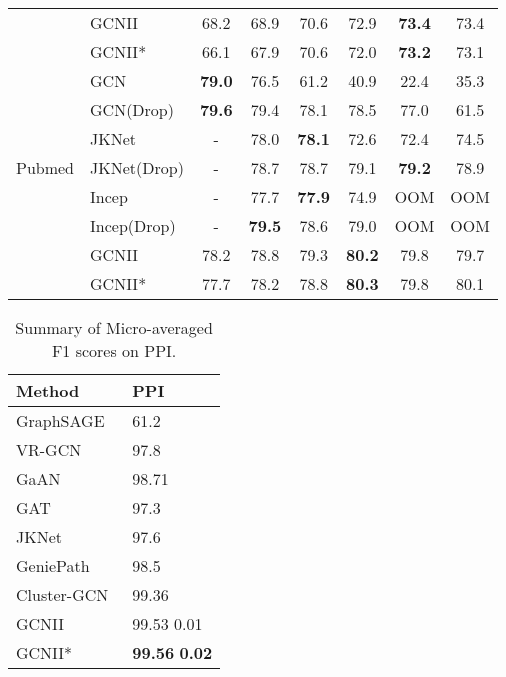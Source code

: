 \documentclass{article}
\begin{document}
\begin{table}[t]
\begin{small}
{\begin{tabular}{ll|cccccc}
                                        & GCNII & 68.2  & 68.9  & 70.6  & 72.9  & \textbf{73.4}  & 73.4  \\
                                        & GCNII* & 66.1  & 67.9  & 70.6  & 72.0  & \textbf{73.2}  & 73.1  \\
            \midrule
            \multirow{7}{*}{Pubmed}     & GCN & \textbf{79.0}  & 76.5  & 61.2  & 40.9  & 22.4  & 35.3  \\
                                        & GCN(Drop) & \textbf{79.6}  & 79.4  & 78.1  & 78.5  & 77.0  & 61.5  \\
                                        & JKNet & - & 78.0  & \textbf{78.1}  & 72.6  & 72.4 & 74.5  \\
                                        & JKNet(Drop) & - & 78.7  & 78.7  & 79.1  & \textbf{79.2} & 78.9 \\
                                        & Incep & - & 77.7  & \textbf{77.9}  & 74.9  & OOM & OOM  \\
                                        & Incep(Drop) & - & \textbf{79.5}  & 78.6  & 79.0  & OOM & OOM  \\
                                        & GCNII & 78.2  & 78.8  & 79.3  & \textbf{80.2}  & 79.8  & 79.7  \\
                                        & GCNII* & 77.7  & 78.2  & 78.8  & \textbf{80.3}  & 79.8  & 80.1  \\
        \bottomrule
    \end{tabular}}
    \end{small}
\vskip -0.1in
\end{table}

\begin{table}[t]
\caption{Summary of Micro-averaged F1 scores on PPI.}
    \label{ppi-table}
    \vskip 0.15in
    \begin{center}
\begin{tabular}{ll}
    \toprule
    Method & PPI\\
    \midrule
    GraphSAGE~\cite{hamilton2017inductive} & 61.2 \\
    VR-GCN~\cite{DBLP:conf/icml/ChenZS18} & 97.8 \\
    GaAN~\cite{DBLP:conf/uai/ZhangSXMKY18} & 98.71 \\
    GAT~\cite{velickovic2018graph} & 97.3 \\
    JKNet~\cite{DBLP:conf/icml/XuLTSKJ18} & 97.6 \\
    GeniePath~\cite{DBLP:conf/aaai/LiuCLZLSQ19} & 98.5 \\
    Cluster-GCN~\cite{DBLP:conf/kdd/ChiangLSLBH19} & 99.36 \\
    \midrule
    GCNII & 99.53  0.01 \\
    GCNII* & \textbf{99.56}  \textbf{0.02}\\
    \bottomrule
    \end{tabular}
\end{center}
    \vskip -0.1in
  \end{table}
  
\end{document}

